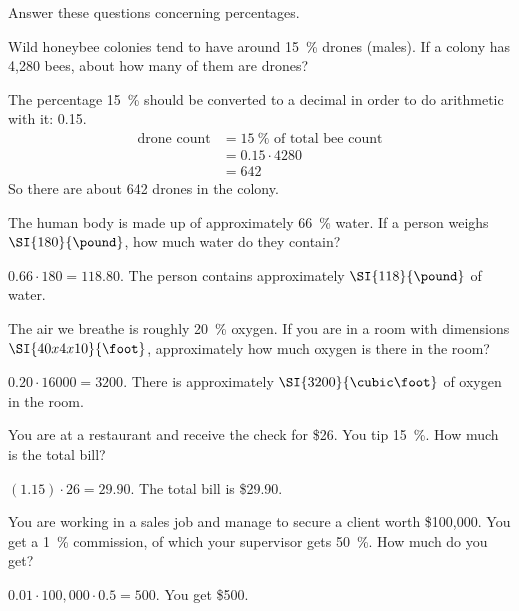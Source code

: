 \begin{exercises}
\begin{problem}
Answer these questions concerning percentages.
\begin{subproblem}
	Wild honeybee colonies tend to have around \SI{15}{\percent} drones (males).   If a colony has 4,280 bees, about how many of them are drones?
	\begin{longsolution}
		The percentage \SI{15}{\percent} should be converted to a decimal in order to do arithmetic with it: 0.15.  
		\begin{align*}
			\textrm{drone count} & = \SI{15}{\percent}\textrm{ of total bee count} \\
			                     & = 0.15\cdot4280                                 \\
			                     & = 642                                           
		\end{align*}
		So there are about 642 drones in the colony.
	\end{longsolution}
\end{subproblem}
\begin{subproblem}
	The human body is made up of approximately \SI{66}{\percent} water. If a person weighs $\SI{180}{\pound}$, how 
	much water do they contain?
	\begin{shortsolution}
		$0.66\cdot 180=118.80$. The person contains approximately $\SI{118}{\pound}$ of water.
	\end{shortsolution}
\end{subproblem}
\begin{subproblem}
	The air we breathe is roughly \SI{20}{\percent} oxygen. If you are in a room with dimensions $\SI{40 x 4 x 10}{\foot}$, approximately how much oxygen is there in the room?
	\begin{shortsolution}
		$0.20\cdot 16000=3200$. There is approximately $\SI{3200}{\cubic\foot}$ of oxygen in the room.
	\end{shortsolution}
\end{subproblem}
\begin{subproblem}
	You are at a restaurant and receive the check for \$26. You tip \SI{15}{\percent}. How 
	much is the total bill?
	\begin{shortsolution}
		$(1.15)\cdot 26=29.90$. The total bill is \$29.90.
	\end{shortsolution}
\end{subproblem}
\begin{subproblem}
	You are working in a sales job and manage to secure a client worth \$100,000. You get a 
	\SI{1}{\percent} commission, of which your supervisor gets \SI{50}{\percent}. How much do you get?
	\begin{shortsolution}
		$0.01\cdot 100,000 \cdot 0.5 = 500$. You get \$500.
	\end{shortsolution}
\end{subproblem}
\end{problem}


\end{exercises}
